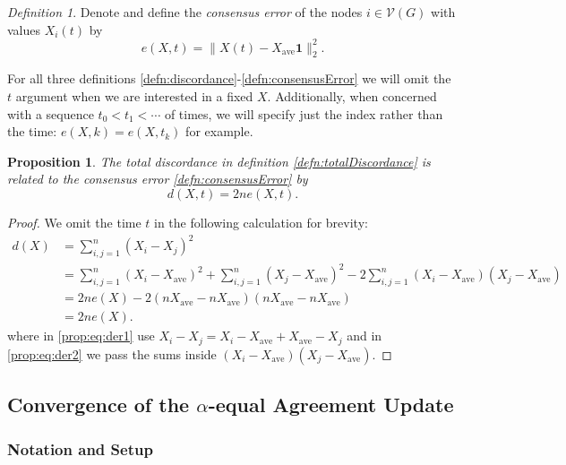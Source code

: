 \documentclass{article}
\newtheorem{proposition}{Proposition}
\theoremstyle{remark}
\newtheorem{definition}{Definition}
\begin{document}
\begin{definition}{\label{defn:consensusError}}
	Denote and define the \textit{consensus error} of the nodes $i\in\mathcal{V}(G)$ with values $X_i(t)$ by 
\begin{equation*}
	e(X,t) = \|X(t)-X_{\text{ave}}\mathbf{1}\|^2_2.
\end{equation*}
\end{definition}

For all three definitions \ref{defn:discordance}-\ref{defn:consensusError} we will omit the $t$ argument when we are interested in a fixed $X$.  Additionally, when concerned with a sequence $t_0<t_1<\cdots$ of times, we will specify just the index rather than the time: $e(X,k) = e(X,t_k)$ for example.

\begin{proposition}{\label{prop:discErrorRelationship}}
	The total discordance in definition \ref{defn:totalDiscordance} is related to the consensus error \ref{defn:consensusError} by 
\begin{equation*}
d(X,t) = 2ne(X,t).
\end{equation*}
\end{proposition}
\begin{proof}
We omit the time $t$ in the following calculation for brevity:
\begin{align}
d(X) &= \sum_{i,j=1}^n(X_i-X_j)^2 \nonumber\\
&= \sum_{i,j=1}^n(X_i-X_{\text{ave}})^2 + \sum_{i,j=1}^n(X_j-X_{\text{ave}})^2 - 2\sum_{i,j=1}^n(X_i-X_{\text{ave}})(X_j-X_{\text{ave}}) \label{prop:eq:der1}\\
&= 2ne(X) -  2(nX_{\text{ave}}-nX_{\text{ave}})(nX_{\text{ave}}-nX_{\text{ave}})\label{prop:eq:der2}\\
&= 2ne(X).
\end{align}
where in \eqref{prop:eq:der1} use $X_i-X_j = X_i - X_{\text{ave}} + X_{\text{ave}} - X_j$ and in \eqref{prop:eq:der2} we pass the sums inside $(X_i-X_{\text{ave}})(X_j-X_{\text{ave}})$.
\end{proof}

\subsection{Convergence of the $\alpha$-equal Agreement Update}

\subsubsection{Notation and Setup}
\end{document}
